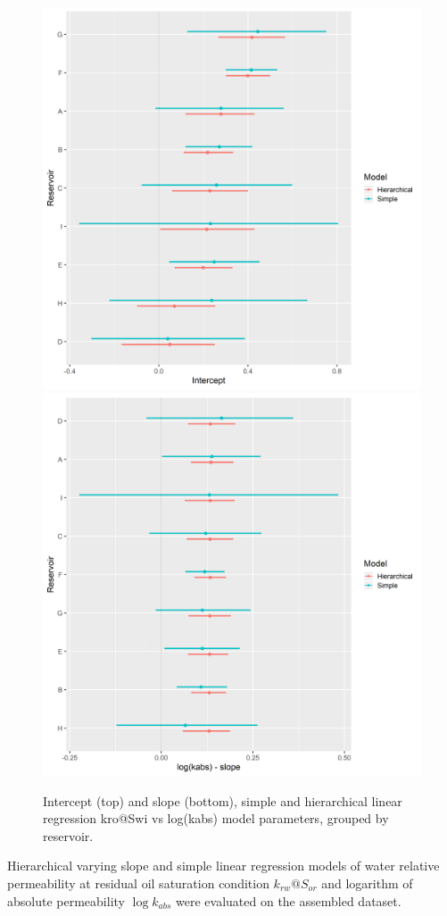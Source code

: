 \documentclass[english,msc,numbers]{coppe}
\begin{document}
  \begin{figure}
  
  {\centering \includegraphics[width=0.75\linewidth]{figure/4-13-kro-intercept} \includegraphics[width=0.75\linewidth]{figure/4-13-kro-slopes} 
  
  }
  
  \caption{Intercept (top) and slope (bottom), simple and hierarchical linear regression kro@Swi vs log(kabs) model  parameters, grouped by reservoir.}\label{fig:kro-simple-hierarchical-coefs}
  \end{figure}
  \par
  
  Hierarchical varying slope and simple linear regression models of water relative permeability at residual oil saturation condition \(k_{rw}@S_{or}\) and logarithm of absolute permeability \(\log{k_{abs}}\) were evaluated on the assembled dataset.
  
\end{document}
